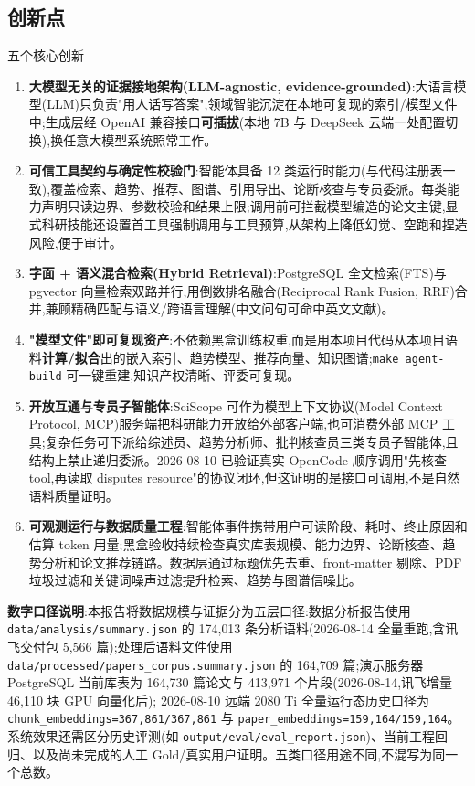 \subsection{创新点}
\begin{reportbox}{五个核心创新}
\begin{enumerate}
\item \textbf{大模型无关的证据接地架构(LLM-agnostic, evidence-grounded)}:大语言模型(LLM)只负责"用人话写答案",领域智能沉淀在本地可复现的索引/模型文件中;生成层经 OpenAI 兼容接口\textbf{可插拔}(本地 7B 与 DeepSeek 云端一处配置切换),换任意大模型系统照常工作。
\item \textbf{可信工具契约与确定性校验门}:智能体具备 12 类运行时能力(与代码注册表一致),覆盖检索、趋势、推荐、图谱、引用导出、论断核查与专员委派。每类能力声明只读边界、参数校验和结果上限;调用前可拦截模型编造的论文主键,显式科研技能还设置首工具强制调用与工具预算,从架构上降低幻觉、空跑和捏造风险,便于审计。
\item \textbf{字面 + 语义混合检索(Hybrid Retrieval)}:PostgreSQL 全文检索(FTS)与 pgvector 向量检索双路并行,用倒数排名融合(Reciprocal Rank Fusion, RRF)合并,兼顾精确匹配与语义/跨语言理解(中文问句可命中英文文献)。
\item \textbf{"模型文件"即可复现资产}:不依赖黑盒训练权重,而是用本项目代码从本项目语料\textbf{计算/拟合}出的嵌入索引、趋势模型、推荐向量、知识图谱;\texttt{make agent-build} 可一键重建,知识产权清晰、评委可复现。
\item \textbf{开放互通与专员子智能体}:SciScope 可作为模型上下文协议(Model Context Protocol, MCP)服务端把科研能力开放给外部客户端,也可消费外部 MCP 工具;复杂任务可下派给综述员、趋势分析师、批判核查员三类专员子智能体,且结构上禁止递归委派。2026-08-10 已验证真实 OpenCode 顺序调用"先核查 tool,再读取 disputes resource"的协议闭环,但这证明的是接口可调用,不是自然语料质量证明。
\item \textbf{可观测运行与数据质量工程}:智能体事件携带用户可读阶段、耗时、终止原因和估算 token 用量;黑盒验收持续检查真实库表规模、能力边界、论断核查、趋势分析和论文推荐链路。数据层通过标题优先去重、front-matter 剔除、PDF 垃圾过滤和关键词噪声过滤提升检索、趋势与图谱信噪比。
\end{enumerate}
\end{reportbox}

\begin{plainbox}
\textbf{数字口径说明}:本报告将数据规模与证据分为五层口径:数据分析报告使用 \texttt{data/analysis/summary.json} 的 174{,}013 条分析语料(2026-08-14 全量重跑,含讯飞交付包 5{,}566 篇);处理后语料文件使用 \texttt{data/processed/papers\_corpus.summary.json} 的 164{,}709 篇;演示服务器 PostgreSQL 当前库表为 164{,}730 篇论文与 413{,}971 个片段(2026-08-14,讯飞增量 46{,}110 块 GPU 向量化后); 2026-08-10 远端 2080 Ti 全量运行态历史口径为 \texttt{chunk\_embeddings=367{,}861/367{,}861} 与 \texttt{paper\_embeddings=159{,}164/159{,}164}。系统效果还需区分历史评测(如 \texttt{output/eval/eval\_report.json})、当前工程回归、以及尚未完成的人工 Gold/真实用户证明。五类口径用途不同,不混写为同一个总数。
\end{plainbox}
